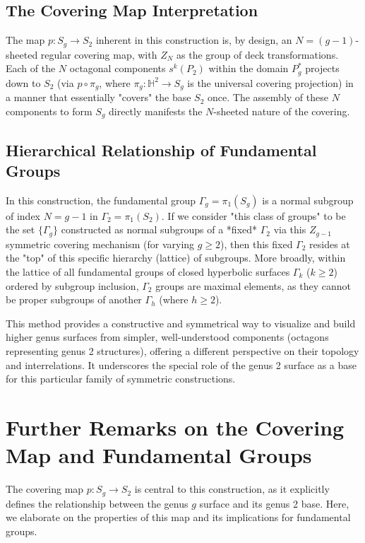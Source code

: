 \documentclass{article}
\theoremstyle{definition}
\theoremstyle{remark}
\begin{document}
\subsection*{The Covering Map Interpretation}
The map $p: S_g \to S_2$ inherent in this construction is, by design, an $N=(g-1)$-sheeted regular covering map, with $Z_N$ as the group of deck transformations. Each of the $N$ octagonal components $s^k(P_2)$ within the domain $P_g^*$ projects down to $S_2$ (via $p \circ \pi_g$, where $\pi_g: \mathbb{H}^2 \to S_g$ is the universal covering projection) in a manner that essentially "covers" the base $S_2$ once. The assembly of these $N$ components to form $S_g$ directly manifests the $N$-sheeted nature of the covering.

\subsection*{Hierarchical Relationship of Fundamental Groups}
In this construction, the fundamental group $\Gamma_g = \pi_1(S_g)$ is a normal subgroup of index $N=g-1$ in $\Gamma_2 = \pi_1(S_2)$. If we consider "this class of groups" to be the set $\{\Gamma_g\}$ constructed as normal subgroups of a *fixed* $\Gamma_2$ via this $Z_{g-1}$ symmetric covering mechanism (for varying $g \ge 2$), then this fixed $\Gamma_2$ resides at the "top" of this specific hierarchy (lattice) of subgroups. More broadly, within the lattice of all fundamental groups of closed hyperbolic surfaces $\Gamma_k$ ($k \ge 2$) ordered by subgroup inclusion, $\Gamma_2$ groups are maximal elements, as they cannot be proper subgroups of another $\Gamma_h$ (where $h \ge 2$).

This method provides a constructive and symmetrical way to visualize and build higher genus surfaces from simpler, well-understood components (octagons representing genus 2 structures), offering a different perspective on their topology and interrelations. It underscores the special role of the genus 2 surface as a base for this particular family of symmetric constructions.

\section{Further Remarks on the Covering Map and Fundamental Groups}
The covering map \(p: S_g \to S_2\) is central to this construction, as it explicitly defines the relationship between the genus \(g\) surface and its genus 2 base. Here, we elaborate on the properties of this map and its implications for fundamental groups.
\end{document}

